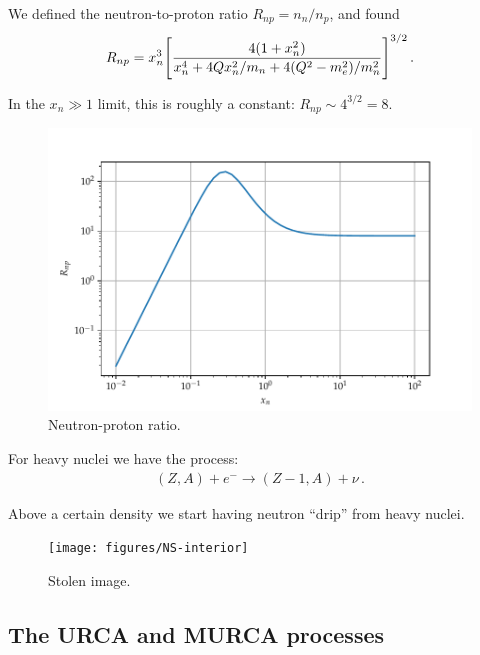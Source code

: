\documentclass[main.tex]{subfiles}
\begin{document}

We defined the neutron-to-proton ratio \(R_{np} = n_n / n_p\), and found 
%
\begin{align}
R_{np} = x_n^3 \qty[\frac{4 (1 + x_n^2)}{x_n^4 + 4 Q x_n^2 / m_n + 4 (Q^2- m_e^2) / m_n^2}]^{3/2}
\,.
\end{align}

In the \(x_n \gg 1\) limit, this is roughly a constant: \(R_{np} \sim 4^{3/2} = 8\).

\begin{figure}[ht]
\centering
\includegraphics[width=\textwidth]{figures/neutron-proton-ratio}
\caption{Neutron-proton ratio.}
\label{fig:neutron-proton-ratio}
\end{figure}

For heavy nuclei we have the process:
%
\begin{align}
(Z, A) + e^{-} \to (Z-1, A) + \nu 
\,.
\end{align}

Above a certain density we start having neutron ``drip'' from heavy nuclei.

\begin{figure}[ht]
\centering
\texttt{[image: figures/NS-interior]}
\caption{Stolen image.}
\label{fig:NS-interior}
\end{figure}

\subsection{The URCA and MURCA processes}
\end{document}
